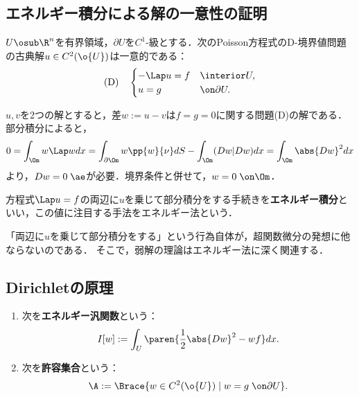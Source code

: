 \documentclass[uplatex,dvipdfmx]{jsreport}
\begin{document}
\subsection{エネルギー積分による解の一意性の証明}

\begin{proposition}
    $U\osub\R^n$を有界領域，$\partial U$を$C^1$-級とする．次のPoisson方程式のD-境界値問題の古典解$u\in C^2(\o{U})$は一意的である：
    \[\text{(D)}\quad\begin{cases}
        -\Lap u=f&\interior U,\\
        u=g&\on\partial U.
    \end{cases}\]
\end{proposition}
\begin{Proof}
    $u,v$を2つの解とすると，差$w:=u-v$は$f=g=0$に関する問題(D)の解である．
    部分積分によると，
    \[0=\int_\Om w\Lap wdx=\int_{\partial\Om} w\pp{w}{\nu}dS-\int_\Om(D w|Dw)dx=\int_\Om\abs{Dw}^2dx\]
    より，$Dw=0\;\ae$が必要．境界条件と併せて，$w=0\;\on\Om$．
\end{Proof}

\begin{definition}
    方程式$\Lap u=f$の両辺に$u$を乗じて部分積分をする手続きを\textbf{エネルギー積分}といい，この値に注目する手法をエネルギー法という．
\end{definition}
\begin{remarks}
    「両辺に$u$を乗じて部分積分をする」という行為自体が，超関数微分の発想に他ならないのである．
    そこで，弱解の理論はエネルギー法に深く関連する．
\end{remarks}

\subsection{Dirichletの原理}

\begin{definition}\mbox{}
    \begin{enumerate}
        \item 次を\textbf{エネルギー汎関数}という：
        \[I[w]:=\int_U\paren{\frac{1}{2}\abs{Dw}^2-wf}dx.\]
        \item 次を\textbf{許容集合}という：
        \[\A:=\Brace{w\in C^2(\o{U})\mid w=g\;\on\partial U}.\]
    \end{enumerate}
\end{definition}
\end{document}
